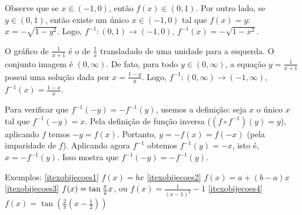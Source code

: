 \begin{Solution}{2.26}
Observe que se $x\in (-1,0)$, então $f(x)\in (0,1)$. Por outro lado, se $y\in (0,1)$,
então existe um único $x\in (-1,0)$ tal que $f(x)=y$: $x=-\sqrt{1-y^2}$.
Logo, $f^{-1}:(0,1)\to(-1,0)$, $f^{-1}(x)=-\sqrt{1-x^2}$.
\begin{center}
\begin{bmlimage}\end{bmlimage}
\end{center}
\end{Solution}
\begin{Solution}{2.27}
O gráfico de $\frac{1}{x+1}$ é o de $\tfrac1x$ transladado de uma unidade para a esquerda.
O conjunto imagem é $(0,\infty)$. De fato, para todo $y\in (0,\infty)$, a equação $y=\frac{1}{x+1}$
possui uma solução dada por $x=\frac{1-y}{y}$. Logo, $f^{-1}:(0,\infty)\to (-1,\infty)$,
$f^{-1}(x)=\frac{1-x}{x}$.
\end{Solution}
\begin{Solution}{2.28}
Para verificar que $f^{-1}(-y)=-f^{-1}(y)$, usemos a definição: seja $x$ o único
$x$ tal que $f^{-1}(-y)=x$. Pela definição de função inversa ($(f\circ
f^{-1})(y)=y$), aplicando
$f$ temos $-y=f(x)$. Portanto, $y=-f(x)=f(-x)$ (pela imparidade de $f$).
Aplicando agora $f^{-1}$ obtemos $f^{-1}(y)=-x$, isto é, $x=-f^{-1}(y)$. Isso
mostra que
$f^{-1}(-y)=-f^{-1}(y)$.
\end{Solution}
\begin{Solution}{2.29}
Exemplos:
\eqref{itexobijecoes1} $f(x)=bx$
\eqref{itexobijecoes2} $f(x)=a+(b-a)x$
\eqref{itexobijecoes3} $f(x)=\tan \tfrac{\pi}{2}{x}$, ou $f(x)=\tfrac{1}{(x-1)^2}-1$
\eqref{itexobijecoes4} $f(x)=\tan (\tfrac{2}{\pi}(x-\tfrac12))$
\end{Solution}
